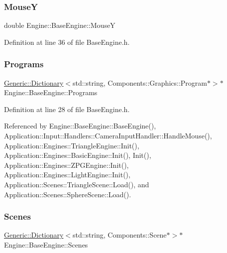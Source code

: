 \subsubsection{\texorpdfstring{MouseY}{MouseY}}
{\footnotesize\ttfamily double Engine\+::\+Base\+Engine\+::\+MouseY\hspace{0.3cm}{\ttfamily [inherited]}}



Definition at line 36 of file Base\+Engine.\+h.

\mbox{\label{classEngine_1_1BaseEngine_ae0f86360ea3a384caefe443dd8f88601}} 
\subsubsection{\texorpdfstring{Programs}{Programs}}
{\footnotesize\ttfamily \mbox{\hyperlink{classGeneric_1_1Dictionary}{Generic\+::\+Dictionary}}$<$std\+::string, Components\+::\+Graphics\+::\+Program$\ast$$>$$\ast$ Engine\+::\+Base\+Engine\+::\+Programs\hspace{0.3cm}{\ttfamily [inherited]}}



Definition at line 28 of file Base\+Engine.\+h.



Referenced by Engine\+::\+Base\+Engine\+::\+Base\+Engine(), Application\+::\+Input\+::\+Handlers\+::\+Camera\+Input\+Handler\+::\+Handle\+Mouse(), Application\+::\+Engines\+::\+Triangle\+Engine\+::\+Init(), Application\+::\+Engines\+::\+Basic\+Engine\+::\+Init(), Init(), Application\+::\+Engines\+::\+Z\+P\+G\+Engine\+::\+Init(), Application\+::\+Engines\+::\+Light\+Engine\+::\+Init(), Application\+::\+Scenes\+::\+Triangle\+Scene\+::\+Load(), and Application\+::\+Scenes\+::\+Sphere\+Scene\+::\+Load().

\mbox{\label{classEngine_1_1BaseEngine_afd02af3c2fbe9bb734db014dec06585a}} 
\subsubsection{\texorpdfstring{Scenes}{Scenes}}
{\footnotesize\ttfamily \mbox{\hyperlink{classGeneric_1_1Dictionary}{Generic\+::\+Dictionary}}$<$std\+::string, Components\+::\+Scene$\ast$$>$$\ast$ Engine\+::\+Base\+Engine\+::\+Scenes\hspace{0.3cm}{\ttfamily [inherited]}}



